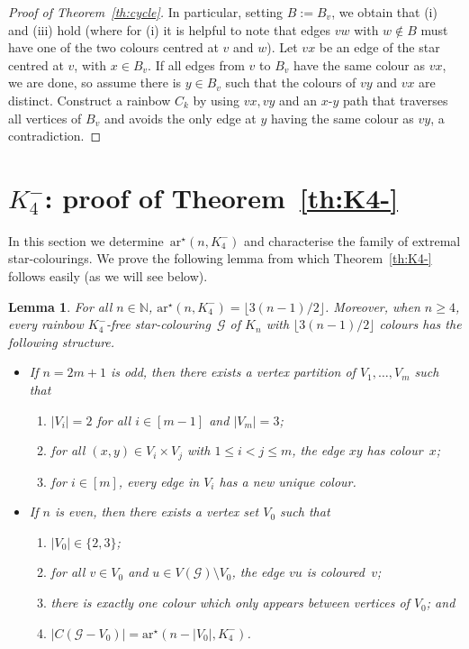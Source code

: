 \documentclass[a4paper, 12pt]{article}
\numberwithin{equation}{section}
\newtheorem{lemma}[theorem]{Lemma}
\def\sar{{\mathrm{ar}^{\star}}}
\newcommand{\ms}[1]{\mathscr{#1}}
\begin{document}
\begin{proof}[Proof of Theorem~\ref{th:cycle}]
    In particular, setting $B:=B_v$, we obtain that (i) and (iii) hold (where for (i) it is helpful to note that edges  $vw$ with $w\notin B$ must have one of the two colours centred at $v$ and  $w$).
  Let $vx$ be an edge of the star centred at $v$, with $x\in B_v$. If all  edges from $v$ to $B_v$ have the same colour as $vx$, we are done, so assume there is $y\in B_v$ such that the colours of $vy$ and $vx$ are distinct. Construct a rainbow $C_k$ by using $vx, vy$ and an $x$-$y$ path that traverses all vertices of $B_v$ and avoids the only edge at $y$ having the same colour as $vy$, a contradiction.
\end{proof}





\section{$K_4^-$: proof of Theorem~\ref{th:K4-}}
\label{sec:K4-}

In this section we determine~$\sar(n,K_4^-)$ and characterise the family of extremal star-colourings.
We prove the following lemma from which Theorem~\ref{th:K4-} follows easily (as we will see below).


\begin{lemma}\label{lm:K4-2}
For all $n\in \mathbb{N}$, $\sar(n, K_4^-) = \lfloor 3(n-1)/2 \rfloor$.
Moreover, when $n \ge 4$, 
every rainbow $K_4^-$-free star-colouring~$\ms{G}$ of $K_n$ with $\lfloor 3(n-1)/2\rfloor$ colours has the following structure.
\begin{itemize}
\item If $n=2m+1$ is odd, then there exists a vertex partition of $V_1, \dots, V_{m}$ such that 
\begin{enumerate}[label = {\rm(\alph*)}]
	\item $|V_i| = 2$ for all $i \in [m-1]$ and $|V_{m}| = 3$; \label{itm:th:K4-:1}
	\item for all $(x,y) \in V_i \times V_j$ with $1 \le i < j \le m$, the edge $xy$ has colour~$x$; \label{itm:th:K4-:2}
	\item for $i \in [m]$, every edge in $V_i$ has a new unique colour. \label{itm:th:K4-:3}
\end{enumerate}
	\item If $n$ is even, then there exists a vertex set $V_0$ such that 
    \begin{enumerate}[label = {\rm(\alph*$'$)}]
	\item 
    $|V_0| \in \{2,3\}$; 
		\item for all $v \in V_0$ and $u \in V(\ms{G}) \setminus V_0$, the edge $vu$ is coloured~$v$; 
        	\item  there is exactly one colour which only appears between vertices of $V_0$; and 
            	\item $|C(\ms{G} - V_0)| = \sar(n - |V_0|, K_4^-)$. 
 \end{enumerate}
\end{itemize}
\end{lemma}
\end{document}
